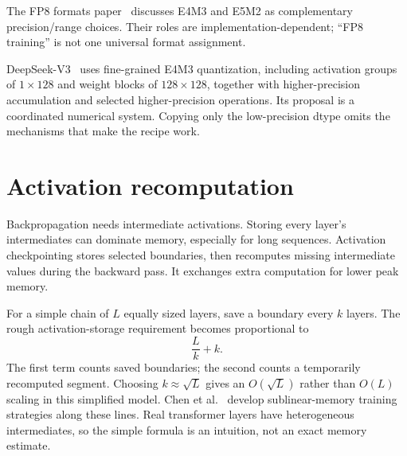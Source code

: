 The FP8 formats paper~\cite{fp8} discusses E4M3 and E5M2 as complementary precision/range choices. Their roles are implementation-dependent; ``FP8 training'' is not one universal format assignment.


DeepSeek-V3~\cite{deepseekv3} uses fine-grained E4M3 quantization, including activation groups of $1\times128$ and weight blocks of $128\times128$, together with higher-precision accumulation and selected higher-precision operations. Its proposal is a coordinated numerical system. Copying only the low-precision dtype omits the mechanisms that make the recipe work.


\section{Activation recomputation}
Backpropagation needs intermediate activations. Storing every layer's intermediates can dominate memory, especially for long sequences. Activation checkpointing stores selected boundaries, then recomputes missing intermediate values during the backward pass. It exchanges extra computation for lower peak memory.


For a simple chain of $L$ equally sized layers, save a boundary every $k$ layers. The rough activation-storage requirement becomes proportional to
\[
\frac{L}{k}+k.
\]
The first term counts saved boundaries; the second counts a temporarily recomputed segment. Choosing $k\approx\sqrt L$ gives an $O(\sqrt L)$ rather than $O(L)$ scaling in this simplified model. Chen et al.~\cite{checkpoint} develop sublinear-memory training strategies along these lines. Real transformer layers have heterogeneous intermediates, so the simple formula is an intuition, not an exact memory estimate.


